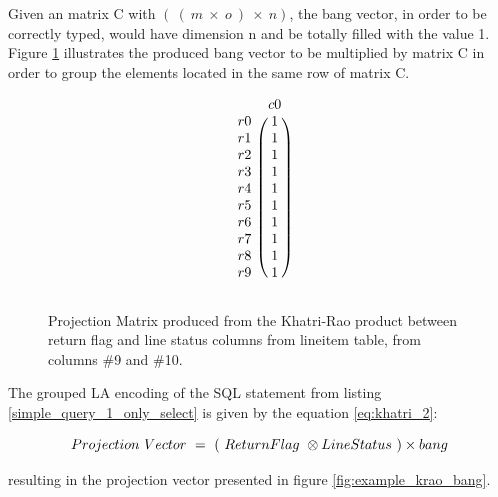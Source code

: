 Given an matrix C with $(\ (\ m\ \times\ o\ )\ \times\ n)$, the bang vector, in order to be correctly typed, would have dimension n and be totally filled with the value 1. Figure \ref{fig:example_bang} illustrates the produced bang vector to be multiplied by matrix C in order to group the elements located in the same row of matrix C.\par 

\begin{figure}[H]
\centering
\caption{Projection Matrix produced from the Khatri-Rao product between return flag and line status columns from lineitem table, from columns \#9 and \#10.}
\[
\begin{blockarray}{cc}
		& c	0	\\
\begin{block}{c(c)}
r	0	&	1	\\
r	1	&	1	\\
r	2	&	1	\\
r	3	&	1	\\
r	4	&	1	\\
r	5	&	1	\\
r	6	&	1	\\
r	7	&	1	\\
r	8	&	1	\\
r	9	&	1	\\
\end{block}
\end{blockarray}
\]
\label{fig:example_bang}
\end{figure}

The grouped LA encoding of the SQL statement from listing \ref{simple_query_1_only_select} is given by the equation \ref{eq:khatri_2}:
 
\begin{equation}
\centering
Projection\ Vector\ =\ (\ ReturnFlag\ \otimes LineStatus\ ) \times bang
\label{eq:khatri_2}
\end{equation}

resulting in the projection vector presented in figure \ref{fig:example_krao_bang}.




